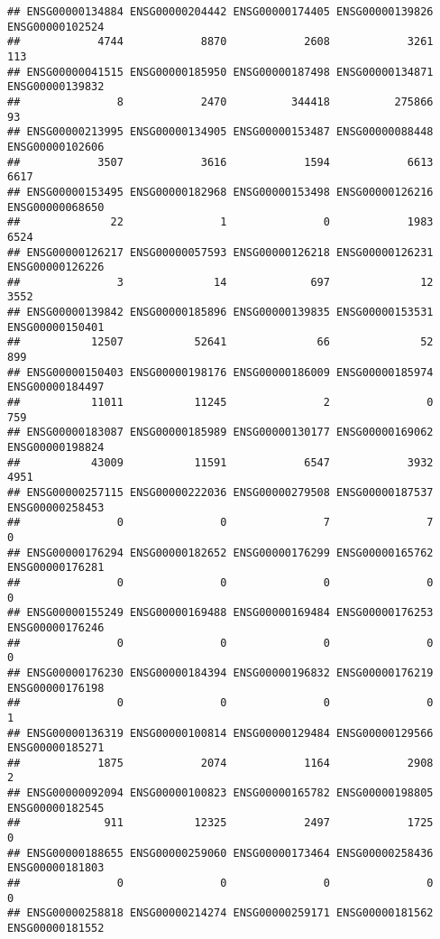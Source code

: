 \documentclass[
]{article}
\begin{document}
\begin{verbatim}
## ENSG00000134884 ENSG00000204442 ENSG00000174405 ENSG00000139826 ENSG00000102524 
##            4744            8870            2608            3261             113 
## ENSG00000041515 ENSG00000185950 ENSG00000187498 ENSG00000134871 ENSG00000139832 
##               8            2470          344418          275866              93 
## ENSG00000213995 ENSG00000134905 ENSG00000153487 ENSG00000088448 ENSG00000102606 
##            3507            3616            1594            6613            6617 
## ENSG00000153495 ENSG00000182968 ENSG00000153498 ENSG00000126216 ENSG00000068650 
##              22               1               0            1983            6524 
## ENSG00000126217 ENSG00000057593 ENSG00000126218 ENSG00000126231 ENSG00000126226 
##               3              14             697              12            3552 
## ENSG00000139842 ENSG00000185896 ENSG00000139835 ENSG00000153531 ENSG00000150401 
##           12507           52641              66              52             899 
## ENSG00000150403 ENSG00000198176 ENSG00000186009 ENSG00000185974 ENSG00000184497 
##           11011           11245               2               0             759 
## ENSG00000183087 ENSG00000185989 ENSG00000130177 ENSG00000169062 ENSG00000198824 
##           43009           11591            6547            3932            4951 
## ENSG00000257115 ENSG00000222036 ENSG00000279508 ENSG00000187537 ENSG00000258453 
##               0               0               7               7               0 
## ENSG00000176294 ENSG00000182652 ENSG00000176299 ENSG00000165762 ENSG00000176281 
##               0               0               0               0               0 
## ENSG00000155249 ENSG00000169488 ENSG00000169484 ENSG00000176253 ENSG00000176246 
##               0               0               0               0               0 
## ENSG00000176230 ENSG00000184394 ENSG00000196832 ENSG00000176219 ENSG00000176198 
##               0               0               0               0               1 
## ENSG00000136319 ENSG00000100814 ENSG00000129484 ENSG00000129566 ENSG00000185271 
##            1875            2074            1164            2908               2 
## ENSG00000092094 ENSG00000100823 ENSG00000165782 ENSG00000198805 ENSG00000182545 
##             911           12325            2497            1725               0 
## ENSG00000188655 ENSG00000259060 ENSG00000173464 ENSG00000258436 ENSG00000181803 
##               0               0               0               0               0 
## ENSG00000258818 ENSG00000214274 ENSG00000259171 ENSG00000181562 ENSG00000181552 

\end{verbatim}
\end{document}
